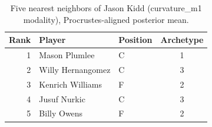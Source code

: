 \begin{table}[htbp]
  \centering\small
  \begin{tabular}{rllc}
    \toprule
    Rank & Player & Position & Archetype \\
    \midrule
    1 & Mason Plumlee & C & 1 \\
    2 & Willy Hernangomez & C & 3 \\
    3 & Kenrich Williams & F & 2 \\
    4 & Jusuf Nurkic & C & 3 \\
    5 & Billy Owens & F & 2 \\
    \bottomrule
  \end{tabular}
  \caption{Five nearest neighbors of Jason Kidd (curvature_m1 modality), Procrustes-aligned posterior mean.}
  \label{tab:Jason_Kidd_neighbors_curvature_m1}
\end{table}

